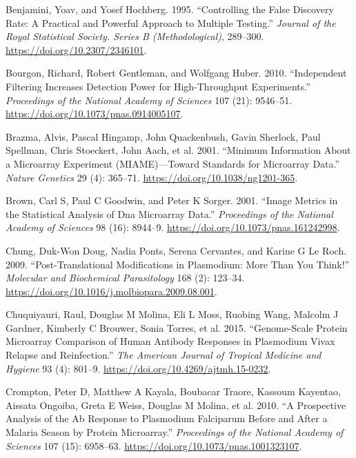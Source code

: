 \documentclass[
  a4paper]{article}
\begin{document}
\leavevmode\hypertarget{ref-benjamini1995fdr}{}%
Benjamini, Yoav, and Yosef Hochberg. 1995. ``Controlling the False
Discovery Rate: A Practical and Powerful Approach to Multiple Testing.''
\emph{Journal of the Royal Statistical Society. Series B
(Methodological)}, 289--300. \url{https://doi.org/10.2307/2346101}.

\leavevmode\hypertarget{ref-bourgon2010filter}{}%
Bourgon, Richard, Robert Gentleman, and Wolfgang Huber. 2010.
``Independent Filtering Increases Detection Power for High-Throughput
Experiments.'' \emph{Proceedings of the National Academy of Sciences}
107 (21): 9546--51. \url{https://doi.org/10.1073/pnas.0914005107}.

\leavevmode\hypertarget{ref-brazma2001}{}%
Brazma, Alvis, Pascal Hingamp, John Quackenbush, Gavin Sherlock, Paul
Spellman, Chris Stoeckert, John Aach, et al. 2001. ``Minimum Information
About a Microarray Experiment (MIAME)---Toward Standards for Microarray
Data.'' \emph{Nature Genetics} 29 (4): 365--71.
\url{https://doi.org/10.1038/ng1201-365}.

\leavevmode\hypertarget{ref-brown2001image}{}%
Brown, Carl S, Paul C Goodwin, and Peter K Sorger. 2001. ``Image Metrics
in the Statistical Analysis of Dna Microarray Data.'' \emph{Proceedings
of the National Academy of Sciences} 98 (16): 8944--9.
\url{https://doi.org/10.1073/pnas.161242998}.

\leavevmode\hypertarget{ref-leroch2009postmod}{}%
Chung, Duk-Won Doug, Nadia Ponts, Serena Cervantes, and Karine G Le
Roch. 2009. ``Post-Translational Modifications in Plasmodium: More Than
You Think!'' \emph{Molecular and Biochemical Parasitology} 168 (2):
123--34. \url{https://doi.org/10.1016/j.molbiopara.2009.08.001}.

\leavevmode\hypertarget{ref-chuquiyauri2015vivax}{}%
Chuquiyauri, Raul, Douglas M Molina, Eli L Moss, Ruobing Wang, Malcolm J
Gardner, Kimberly C Brouwer, Sonia Torres, et al. 2015. ``Genome-Scale
Protein Microarray Comparison of Human Antibody Responses in Plasmodium
Vivax Relapse and Reinfection.'' \emph{The American Journal of Tropical
Medicine and Hygiene} 93 (4): 801--9.
\url{https://doi.org/10.4269/ajtmh.15-0232}.

\leavevmode\hypertarget{ref-crompton2010}{}%
Crompton, Peter D, Matthew A Kayala, Boubacar Traore, Kassoum Kayentao,
Aissata Ongoiba, Greta E Weiss, Douglas M Molina, et al. 2010. ``A
Prospective Analysis of the Ab Response to Plasmodium Falciparum Before
and After a Malaria Season by Protein Microarray.'' \emph{Proceedings of
the National Academy of Sciences} 107 (15): 6958--63.
\url{https://doi.org/10.1073/pnas.1001323107}.
\end{document}
